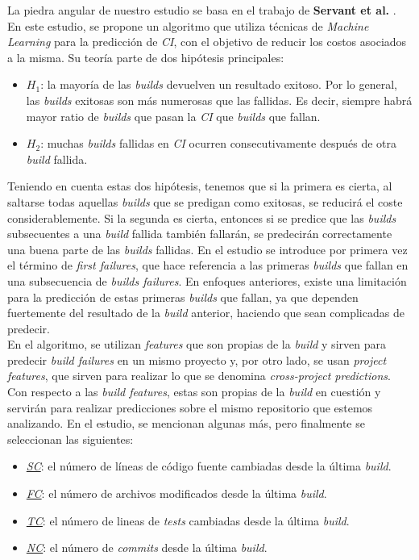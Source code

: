 La piedra angular de nuestro estudio se basa en el trabajo de \textbf{Servant et al.} \cite{2}. En
este estudio, se propone un algoritmo que utiliza técnicas de \textit{Machine Learning}
para la predicción de \textit{CI}, con el objetivo de reducir los costos asociados a la misma.
Su teoría parte de dos hipótesis principales:

\begin{itemize}
      \item \textit{$H_1$}: la mayoría de las \textit{builds} devuelven un resultado exitoso. Por
      lo general, las \textit{builds} exitosas son más numerosas que las fallidas. Es decir,
      siempre habrá mayor ratio de \textit{builds} que pasan la \textit{CI} que \textit{builds}
      que fallan.
      \item \textit{$H_2$}: muchas \textit{builds} fallidas en \textit{CI} ocurren
      consecutivamente después de otra \textit{build} fallida.
\end{itemize}

Teniendo en cuenta estas dos hipótesis, tenemos que si la primera es cierta, al saltarse todas
aquellas \textit{builds} que se predigan como exitosas, se reducirá el coste considerablemente.
Si la segunda es cierta, entonces si se predice que las \textit{builds} subsecuentes a una
\textit{build} fallida también fallarán, se predecirán correctamente una buena parte de las
\textit{builds} fallidas. En el estudio se introduce por primera vez el término de \textit{first
failures}, que hace referencia a las primeras \textit{builds} que fallan en una subsecuencia de
\textit{builds failures}. En enfoques anteriores, existe una limitación para la predicción
de estas primeras \textit{builds} que fallan, ya que dependen fuertemente del resultado de la
\textit{build} anterior, haciendo que sean complicadas de predecir.\\

En el algoritmo, se utilizan \textit{features} que son propias de la \textit{build} y
sirven para predecir \textit{build failures} en un mismo proyecto y, por otro lado, se usan
\textit{project features}, que sirven para realizar lo que se denomina \textit{cross-project
predictions}. Con respecto a las \textit{build features}, estas son propias de la \textit{build}
en cuestión y servirán para realizar predicciones sobre el mismo repositorio que estemos
analizando. En el estudio, se mencionan algunas más, pero finalmente se seleccionan las
siguientes:

\begin{itemize}
      \item \underline{\textit{SC}}: el número de líneas de código fuente cambiadas desde la
      última \textit{build}.
      \item \underline{\textit{FC}}: el número de archivos modificados desde la última
      \textit{build}.
      \item \underline{\textit{TC}}: el número de lineas de \textit{tests} cambiadas desde la
      última \textit{build}.
      \item \underline{\textit{NC}}: el número de \textit{commits} desde la última \textit{build}.
\end{itemize}

